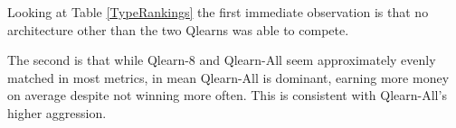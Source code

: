 Looking at Table \ref{TypeRankings} the first immediate observation is that no architecture other than the two Qlearns was able to compete.

The second is that while Qlearn-8 and Qlearn-All seem approximately evenly matched in most metrics, in mean Qlearn-All is dominant, earning more money on average despite not winning more often. This is consistent with Qlearn-All's higher aggression.

\begin{figure}[H]
\centering
{}
\end{figure}
